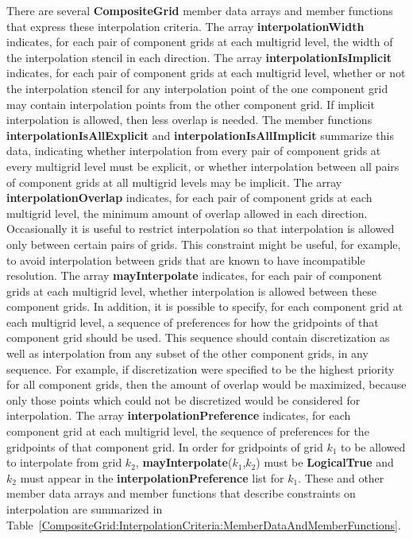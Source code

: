 \documentclass{article}
\begin{document}
There are several \textbf{CompositeGrid} member data arrays and member functions that express these interpolation criteria.  The array
\textbf{interpolationWidth} indicates, for each pair of component grids at each multigrid level, the width of the interpolation stencil in
each direction.  The array \textbf{interpolationIsImplicit} indicates, for each pair of component grids at each multigrid level, whether or
not the interpolation stencil for any interpolation point of the one component grid may contain interpolation points from the other component grid.
If implicit interpolation is allowed, then less overlap is needed.  The member functions \textbf{interpolationIsAllExplicit} and
\textbf{interpolationIsAllImplicit} summarize this data, indicating whether interpolation from every pair of component grids at every
multigrid level must be explicit, or whether interpolation between all pairs of component grids at all multigrid levels may be implicit.  The array
\textbf{interpolationOverlap} indicates, for each pair of component grids at each multigrid level, the minimum amount of overlap allowed in
each direction.  Occasionally it is useful to restrict interpolation so that interpolation is allowed only between certain pairs of grids.  This
constraint might be useful, for example, to avoid interpolation between grids that are known to have incompatible resolution.  The array
\textbf{mayInterpolate} indicates, for each pair of component grids at each multigrid level, whether interpolation is allowed between these
component grids.  In addition, it is possible to specify, for each component grid at each multigrid level, a sequence of preferences for how the
gridpoints of that component grid should be used.  This sequence should contain discretization as well as interpolation from any subset of the other
component grids, in any sequence.  For example, if discretization were specified to be the highest priority for all component grids, then the amount
of overlap would be maximized, because only those points which could not be discretized would be considered for interpolation. The array
\textbf{interpolationPreference} indicates, for each component grid at each multigrid level, the sequence of preferences for the gridpoints of
that component grid.  In order for gridpoints of grid $k_1$ to be allowed to interpolate from grid $k_2$, \textbf{mayInterpolate}($k_1$,$k_2$)
must be \textbf{LogicalTrue} and $k_2$ must appear in the \textbf{interpolationPreference} list for $k_1$.  These and other member
data arrays and member functions that describe constraints on interpolation are summarized in
Table~\ref{CompositeGrid:InterpolationCriteria:MemberDataAndMemberFunctions}.
\end{document}
